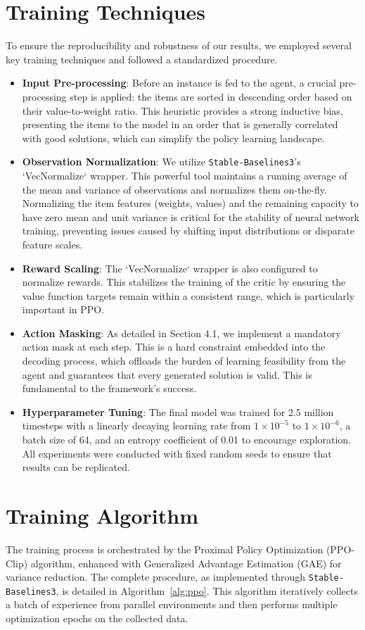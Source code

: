 \section{Training Techniques}
To ensure the reproducibility and robustness of our results, we employed several key training techniques and followed a standardized procedure.
\begin{itemize}
    \item \textbf{Input Pre-processing}: Before an instance is fed to the agent, a crucial pre-processing step is applied: the items are sorted in descending order based on their value-to-weight ratio.
This heuristic provides a strong inductive bias, presenting the items to the model in an order that is generally correlated with good solutions, which can simplify the policy learning landscape.
    \item \textbf{Observation Normalization}: We utilize \texttt{Stable-Baselines3}'s `VecNormalize` wrapper. This powerful tool maintains a running average of the mean and variance of observations and normalizes them on-the-fly.
Normalizing the item features (weights, values) and the remaining capacity to have zero mean and unit variance is critical for the stability of neural network training, preventing issues caused by shifting input distributions or disparate feature scales.
    \item \textbf{Reward Scaling}: The `VecNormalize` wrapper is also configured to normalize rewards.
This stabilizes the training of the critic by ensuring the value function targets remain within a consistent range, which is particularly important in PPO.
    \item \textbf{Action Masking}: As detailed in Section 4.1, we implement a mandatory action mask at each step.
This is a hard constraint embedded into the decoding process, which offloads the burden of learning feasibility from the agent and guarantees that every generated solution is valid.
This is fundamental to the framework's success.
    \item \textbf{Hyperparameter Tuning}: The final model was trained for 2.5 million timesteps with a linearly decaying learning rate from \(1 \times 10^{-5}\) to \(1 \times 10^{-6}\), a batch size of 64, and an entropy coefficient of 0.01 to encourage exploration.
All experiments were conducted with fixed random seeds to ensure that results can be replicated.
\end{itemize}

\section{Training Algorithm}
The training process is orchestrated by the Proximal Policy Optimization (PPO-Clip) algorithm, enhanced with Generalized Advantage Estimation (GAE) for variance reduction.
The complete procedure, as implemented through \texttt{Stable-Baselines3}, is detailed in Algorithm~\ref{alg:ppo}.
This algorithm iteratively collects a batch of experience from parallel environments and then performs multiple optimization epochs on the collected data.

